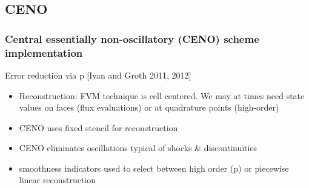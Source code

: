 \documentclass{beamer}
\begin{document}

\subsection{CENO}
\begin{frame}
\scriptsize
\frametitle{Central essentially non-oscillatory (CENO) scheme implementation} 

\begin{minipage}[t][1\textheight]{1\textwidth}
\vspace{-20pt}
\begin{exampleblock}{Error reduction via p}
\tiny
[Ivan and Groth 2011, 2012]
\begin{itemize}
\item Reconstruction: FVM technique is cell centered. We may at times need state values on faces (flux evaluations) or at quadrature points (high-order)
\item CENO uses fixed stencil for reconstruction
\item CENO eliminates oscillations typical of shocks \& discontinuities
\item smoothness indicators used to select between high order (p) or piecewise linear reconstruction
\end{itemize}
\vspace{-20pt}
\tiny
\begin{figure}
\label{fig:h_order_error}
\centering
{}

\end{figure}
\end{exampleblock}
\end{minipage}
\end{frame}
\end{document}
